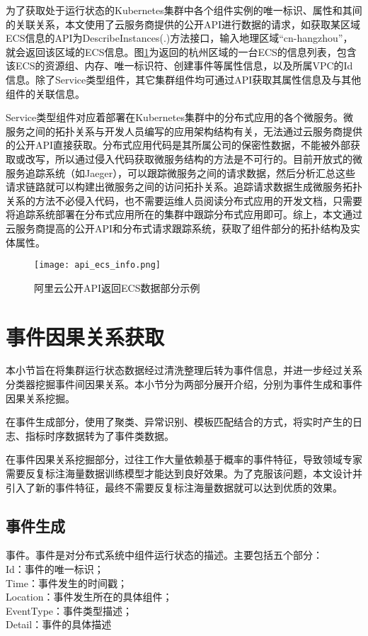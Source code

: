 为了获取处于运行状态的Kubernetes集群中各个组件实例的唯一标识、属性和其间的关联关系，本文使用了云服务商提供的公开API进行数据的请求，如获取某区域ECS信息的API为DescribeInstances(.)方法接口，输入地理区域“cn-hangzhou”，就会返回该区域的ECS信息。图\ref{api_ecs_info}为返回的杭州区域的一台ECS的信息列表，包含该ECS的资源组、内存、唯一标识符、创建事件等属性信息，以及所属VPC的Id信息。除了Service类型组件，其它集群组件均可通过API获取其属性信息及与其他组件的关联信息。

Service类型组件对应着部署在Kubernetes集群中的分布式应用的各个微服务。微服务之间的拓扑关系与开发人员编写的应用架构结构有关，无法通过云服务商提供的公开API直接获取。分布式应用代码是其所属公司的保密性数据，不能被外部获取或改写，所以通过侵入代码获取微服务结构的方法是不可行的。目前开放式的微服务追踪系统（如Jaeger\cite{mengistu2020distributed}），可以跟踪微服务之间的请求数据，然后分析汇总这些请求链路就可以构建出微服务之间的访问拓扑关系。追踪请求数据生成微服务拓扑关系的方法不必侵入代码，也不需要运维人员阅读分布式应用的开发文档，只需要将追踪系统部署在分布式应用所在的集群中跟踪分布式应用即可。综上，本文通过云服务商提高的公开API和分布式请求跟踪系统，获取了组件部分的拓扑结构及实体属性。
\begin{figure}[htbp]
    \centering
    \texttt{[image: api\_ecs\_info.png]}
    \caption{阿里云公开API返回ECS数据部分示例\label{api_ecs_info}}
\end{figure}

\section{事件因果关系获取}
本小节旨在将集群运行状态数据经过清洗整理后转为事件信息，并进一步经过关系分类器挖掘事件间因果关系。本小节分为两部分展开介绍，分别为事件生成和事件因果关系挖掘。

在事件生成部分，使用了聚类、异常识别、模板匹配结合的方式，将实时产生的日志、指标时序数据转为了事件类数据。

在事件因果关系挖掘部分，过往工作大量依赖基于概率的事件特征，导致领域专家需要反复标注海量数据训练模型才能达到良好效果。为了克服该问题，本文设计并引入了新的事件特征，最终不需要反复标注海量数据就可以达到优质的效果。
\subsection{事件生成}\label{event-generate}
\begin{definition}[事件]
    \label{event-define}
    事件。事件是对分布式系统中组件运行状态的描述。主要包括五个部分：
    {\\\qquad
        Id：事件的唯一标识；\\
        Time：事件发生的时间戳；\\\qquad
        Location：事件发生所在的具体组件；\\\qquad
        EventType：事件类型描述；\\\qquad
        Detail：事件的具体描述\\\qquad
    }
\end{definition}

